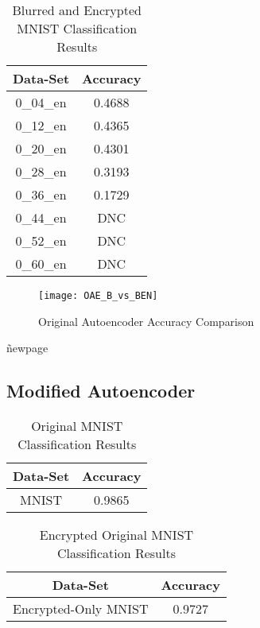 \documentclass[12pt, titlepage]{article}
\begin{document}
\begin{table}[!h]
	\begin{center}
		\begin{tabular}{| c | c |}
			\hline
			\textbf{Data-Set} & \textbf{Accuracy}\\
			\hline
			0\_04\_en & 0.4688\\
			\hline
			0\_12\_en & 0.4365\\
			\hline
			0\_20\_en & 0.4301\\
			\hline
			0\_28\_en & 0.3193\\
			\hline
			0\_36\_en & 0.1729\\
			\hline
			0\_44\_en & DNC\\
			\hline
			0\_52\_en & DNC\\
			\hline
			0\_60\_en & DNC\\
			\hline
		\end{tabular}
		\caption{Blurred and Encrypted MNIST Classification Results}
		\label{table:basicAE_BlurredEncrypted}
	\end{center}
\end{table}

\begin{figure}[h!]
	\begin{center}
		\texttt{[image: OAE\_B\_vs\_BEN]}
		\caption{Original Autoencoder Accuracy Comparison}
		\label{GRAPH_OriginalAE}
	\end{center}
\end{figure} 

\~newpage
\subsection{Modified Autoencoder} 

\begin{table}[!h]
	\begin{center}
		\begin{tabular}{| c | c |}
			\hline
			\textbf{Data-Set} & \textbf{Accuracy}\\
			\hline
			MNIST & 0.9865\\
			\hline
		\end{tabular}
		\caption{Original MNIST Classification Results}
		\label{table:modAE_MNIST}
	\end{center}
\end{table}

\begin{table}[!h]
	\begin{center}
		\begin{tabular}{| c | c |}
			\hline
			\textbf{Data-Set} & \textbf{Accuracy}\\
			\hline
			Encrypted-Only MNIST & 0.9727\\
			\hline
		\end{tabular}
		\caption{Encrypted Original MNIST Classification Results}
		\label{table:modAE_Encryption}
	\end{center}
\end{table}
\end{document}
